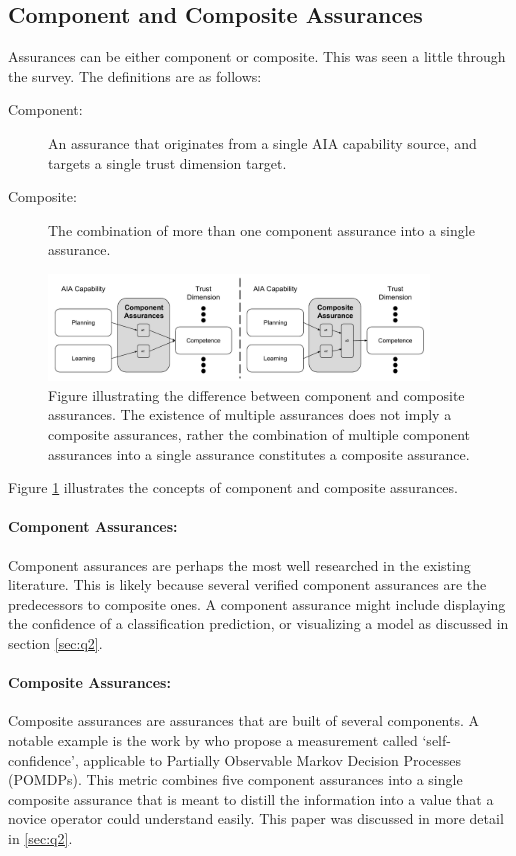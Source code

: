 \subsection{Component and Composite Assurances}
Assurances can be either component or composite. This was seen a little through the survey. The definitions are as follows:

\begin{description}
    \item [Component:] An assurance that originates from a single AIA capability source, and targets a single trust dimension target.
    \item [Composite:] The combination of more than one component assurance into a single assurance. 
\end{description}

\begin{figure}[!htbp]
    \centering
    \includegraphics[width=0.9\textwidth]{Figures/Assurance_component_composite.pdf}
    \caption{Figure illustrating the difference between component and composite assurances. The existence of multiple assurances does not imply a composite assurances, rather the combination of multiple component assurances into a single assurance constitutes a composite assurance.}
    \label{fig:assurance_mapping}
\end{figure}

Figure \ref{fig:assurance_mapping} illustrates the concepts of component and composite assurances.

\paragraph{Component Assurances:} Component assurances are perhaps the most well researched in the existing literature. This is likely because several verified component assurances are the predecessors to composite ones. A component assurance might include displaying the confidence of a classification prediction, or visualizing a model as discussed in section \ref{sec:q2}.

\paragraph{Composite Assurances:} Composite assurances are assurances that are built of several components. A notable example is the work by \citet{Aitken2016-cv} who propose a measurement called `self-confidence', applicable to Partially Observable Markov Decision Processes (POMDPs). This metric combines five component assurances into a single composite assurance that is meant to distill the information into a value that a novice operator could understand easily. This paper was discussed in more detail in \ref{sec:q2}. 
